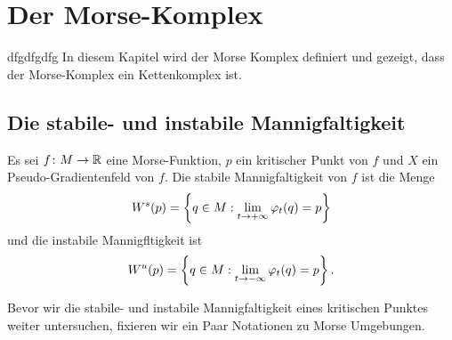 \chapter{Der Morse-Komplex}
dfgdfgdfg
In diesem Kapitel wird der Morse Komplex definiert und gezeigt, dass der 
Morse-Komplex ein Kettenkomplex ist.

\section{Die stabile- und instabile Mannigfaltigkeit}

\begin{definition}
    \label{def: stabile und instabile mannigfaltigkeit}
    Es sei $f \colon M \to { \mathbb R }$ eine Morse-Funktion, $p$ ein kritischer Punkt von $f$ und $X$ ein
    Pseudo-Gradientenfeld von $f$. Die stabile Mannigfaltigkeit von $f$ ist die Menge
    \[ { W^s } (p) = \left\{ q \in M : \lim_{t \to + \infty} \varphi_t(q) = p \right\} \]
    und die instabile Mannigfltigkeit ist
    \[ { W^u } (p) = \left\{ q \in M : \lim_{t \to - \infty} \varphi_t(q) = p \right\} . \]
\end{definition}

Bevor wir die stabile- und instabile Mannigfaltigkeit eines kritischen Punktes weiter untersuchen, 
fixieren wir ein Paar Notationen zu Morse Umgebungen.


